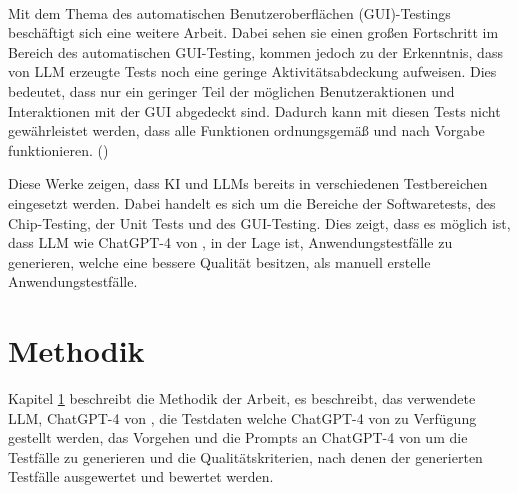 \documentclass[12pt,toc=bib,toc=listof]{scrreprt}
\begin{document}
\\
Mit dem Thema des automatischen Benutzeroberflächen (GUI)-Testings beschäftigt sich eine weitere Arbeit. Dabei sehen sie einen großen Fortschritt im Bereich des automatischen GUI-Testing, kommen jedoch zu der Erkenntnis, dass von LLM erzeugte Tests noch eine geringe Aktivitätsabdeckung aufweisen. Dies bedeutet, dass nur ein geringer Teil der möglichen Benutzeraktionen und Interaktionen mit der GUI abgedeckt sind. Dadurch kann mit diesen Tests nicht gewährleistet werden, dass alle Funktionen ordnungsgemäß und nach Vorgabe funktionieren. (\cite{Liu2024})\\
\newpage

\noindent Diese Werke zeigen, dass KI und LLMs bereits in verschiedenen Testbereichen eingesetzt werden. Dabei handelt es sich um die Bereiche der Softwaretests, des Chip-Testing, der Unit Tests und des GUI-Testing. Dies zeigt, dass es möglich ist, dass LLM wie ChatGPT-4 von \textcite{OpenAI2025}, in der Lage ist, Anwendungstestfälle zu generieren, welche eine bessere Qualität besitzen, als manuell erstelle Anwendungstestfälle.

\chapter{Methodik} %
\label{sec:methodik}
Kapitel \ref{sec:methodik} beschreibt die Methodik der Arbeit, es beschreibt, das verwendete LLM, ChatGPT-4 von \textcite{OpenAI2025}, die Testdaten welche ChatGPT-4 von \textcite{OpenAI2025} zu Verfügung gestellt werden, das Vorgehen und die Prompts an ChatGPT-4 von \textcite{OpenAI2025} um die Testfälle zu generieren  und die Qualitätskriterien, nach denen der generierten Testfälle ausgewertet und bewertet werden.
\end{document}
